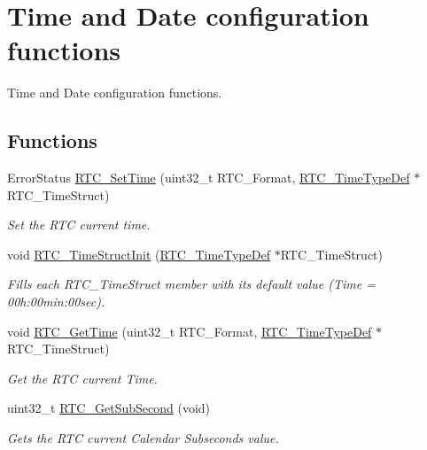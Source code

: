 \hypertarget{group___r_t_c___group2}{\section{Time and Date configuration functions}
\label{group___r_t_c___group2}
}


Time and Date configuration functions.  


\subsection*{Functions}
\begin{DoxyCompactItemize}
\item 
Error\-Status \hyperlink{group___r_t_c___group2_ga9f9df80cfa82f7a4dd9f4d0cf2ffb3a6}{R\-T\-C\-\_\-\-Set\-Time} (uint32\-\_\-t R\-T\-C\-\_\-\-Format, \hyperlink{struct_r_t_c___time_type_def}{R\-T\-C\-\_\-\-Time\-Type\-Def} $\ast$R\-T\-C\-\_\-\-Time\-Struct)
\begin{DoxyCompactList}\small\item\em Set the R\-T\-C current time. \end{DoxyCompactList}\item 
void \hyperlink{group___r_t_c___group2_ga0404db6e0c70e5a6bbbe4fa58a577365}{R\-T\-C\-\_\-\-Time\-Struct\-Init} (\hyperlink{struct_r_t_c___time_type_def}{R\-T\-C\-\_\-\-Time\-Type\-Def} $\ast$R\-T\-C\-\_\-\-Time\-Struct)
\begin{DoxyCompactList}\small\item\em Fills each R\-T\-C\-\_\-\-Time\-Struct member with its default value (Time = 00h\-:00min\-:00sec). \end{DoxyCompactList}\item 
void \hyperlink{group___r_t_c___group2_ga1fcc101339c77aebd25ec3621fd1b61a}{R\-T\-C\-\_\-\-Get\-Time} (uint32\-\_\-t R\-T\-C\-\_\-\-Format, \hyperlink{struct_r_t_c___time_type_def}{R\-T\-C\-\_\-\-Time\-Type\-Def} $\ast$R\-T\-C\-\_\-\-Time\-Struct)
\begin{DoxyCompactList}\small\item\em Get the R\-T\-C current Time. \end{DoxyCompactList}\item 
uint32\-\_\-t \hyperlink{group___r_t_c___group2_gae59c33fb19e36b6abab0bad58072c01a}{R\-T\-C\-\_\-\-Get\-Sub\-Second} (void)
\begin{DoxyCompactList}\small\item\em Gets the R\-T\-C current Calendar Subseconds value. \end{DoxyCompactList}\item 

\end{DoxyCompactItemize}
